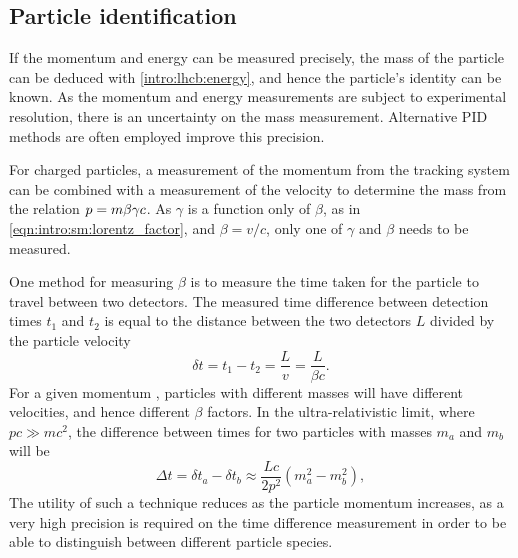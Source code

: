 \subsection{Particle identification}

If the momentum and energy can be measured precisely, the mass of the particle 
can be deduced with \cref{intro:lhcb:energy}, and hence the particle's identity 
can be known.
As the momentum and energy measurements are subject to experimental resolution, 
there is an uncertainty on the mass measurement.
Alternative \ac{PID} methods are often employed improve this precision.

For charged particles, a measurement of the momentum from the tracking system 
can be combined with a measurement of the velocity to determine the mass from 
the relation $p = m\beta\gamma c$.
As $\gamma$ is a function only of $\beta$, as in 
\cref{eqn:intro:sm:lorentz_factor}, and $\beta = v/c$, only one of $\gamma$ and 
$\beta$ needs to be measured.

One method for measuring $\beta$ is to measure the time taken for the particle 
to travel between two detectors.
The measured time difference between detection times $t_{1}$ and $t_{2}$ is 
equal to the distance between the two detectors $L$ divided by the particle 
velocity
\begin{equation}
  \delta t = t_{1} - t_{2} = \frac{L}{v}
           = \frac{L}{\beta c}.
\end{equation}
For a given momentum \ptot, particles with different masses will have different 
velocities, and hence different $\beta$ factors.
In the ultra-relativistic limit, where $pc \gg mc^{2}$, the difference between 
times for two particles with masses $m_{a}$ and $m_{b}$ will be
\begin{equation}
  \Delta t = \delta t_{a} - \delta t_{b}
           \approx \frac{Lc}{2p^{2}}(m_{a}^{2} - m_{b}^{2}),
\end{equation}
The utility of such a technique reduces as the particle momentum increases, as 
a very high precision is required on the time difference measurement in order 
to be able to distinguish between different particle species.

